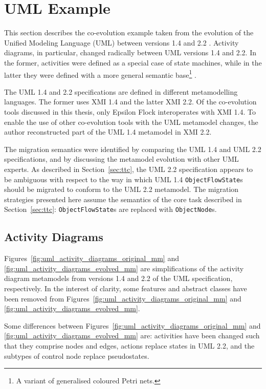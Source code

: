 \section{UML Example}
This section describes the co-evolution example taken from the evolution of the Unified Modeling Language (UML) between versions 1.4 \cite{uml14} and 2.2 \cite{uml22}. Activity diagrams, in particular, changed radically between UML versions 1.4 and 2.2. In the former, activities were defined as a special case of state machines, while in the latter they were defined with a more general semantic base\footnote{A variant of generalised coloured Petri nets.} \cite{selic05uml2}.

The UML 1.4 and 2.2 specifications are defined in different metamodelling languages. The former uses XMI 1.4 and the latter XMI 2.2. Of the co-evolution tools discussed in this thesis, only Epsilon Flock interoperates with XMI 1.4. To enable the use of other co-evolution tools with the UML metamodel changes, the author reconstructed part of the UML 1.4 metamodel in XMI 2.2.

The migration semantics were identified by comparing the UML 1.4 and UML 2.2 specifications, and by discussing the metamodel evolution with other UML experts. As described in Section~\ref{sec:ttc}, the UML 2.2 specification appears to be ambiguous with respect to the way in which UML 1.4 \texttt{ObjectFlowState}s should be migrated to conform to the UML 2.2 metamodel. The migration strategies presented here assume the semantics of the core task described in Section~\ref{sec:ttc}: \texttt{ObjectFlowState}s are replaced with \texttt{ObjectNode}s.

\subsection{Activity Diagrams}
\label{subsec:uml_activity_diagrams}
Figures~\ref{fig:uml_activity_diagrams_original_mm} and \ref{fig:uml_activity_diagrams_evolved_mm} are simplifications of the activity diagram metamodels from versions 1.4 and 2.2 of the UML specification, respectively. In the interest of clarity, some features and abstract classes have been removed from Figures~\ref{fig:uml_activity_diagrams_original_mm} and \ref{fig:uml_activity_diagrams_evolved_mm}.


Some differences between Figures~\ref{fig:uml_activity_diagrams_original_mm} and \ref{fig:uml_activity_diagrams_evolved_mm} are: activities have been changed such that they comprise nodes and edges, actions replace states in UML 2.2, and the subtypes of control node replace pseudostates.

